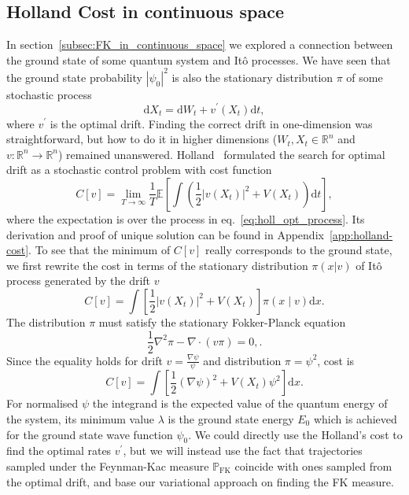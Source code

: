 \subsection{Holland Cost in continuous space}
In section~\ref{subsec:FK_in_continuous_space} we explored a connection between the ground state of some quantum system and It\^ o processes. We have seen that the ground state probability $|\psi_0|^2$ is also the stationary distribution $\pi$ of some stochastic process
\begin{equation}
	\label{eq:holl_opt_process}
	\mathrm{d} X_{t}=\mathrm{d} W_{t}+v^\prime\left(X_{t}\right) \mathrm{d} t,
\end{equation}
where $v^\prime$ is the optimal drift. Finding the correct drift in one-dimension was straightforward, but how to do it in higher dimensions ($W_{t}, X_{t} \in \mathbb{R}^n$ and $v: \mathbb{R}^n \rightarrow \mathbb{R}^n$) remained unanswered. Holland~\cite{holland1977cost} formulated the search for optimal drift as a stochastic control problem with cost function
\begin{equation}
	\label{eq:holland_cost}
	C[v]=\lim _{T \rightarrow \infty} \frac{1}{T} \mathbb{E}\left[\int \left(\frac{1}{2}\left|v\left(X_{t}\right)\right|^{2}+V\left(X_{t}\right)\right)\mathrm{d} t\right],
\end{equation}
where the expectation is over the process in eq.~\eqref{eq:holl_opt_process}. Its derivation and proof of unique solution can be found in Appendix~\ref{app:holland-cost}. To see that the minimum of $C[v]$ really corresponds to the ground state, we first rewrite the cost in terms of the stationary distribution $\pi(x | v)$ of It\^ o process generated by the drift $v$
\begin{equation}
C[v]=\int \left[\frac{1}{2}\left|v\left(X_{t}\right)\right|^{2}+V\left(X_{t}\right)\right] \pi(x \mid v)\mathrm{d}x.
\end{equation}
The distribution $\pi$ must satisfy the stationary Fokker-Planck equation
\begin{equation}
\frac{1}{2} \nabla^{2} \pi-\nabla \cdot(v \pi)=0,.
\end{equation}
Since the equality holds for drift $v = \frac{\nabla \psi}{\psi}$ and distribution $\pi = \psi^2$, cost is
\begin{equation}
C[v]=\int \left[\frac{1}{2}(\nabla \psi)^{2}+V\left(X_{t}\right) \psi^{2}\right]\mathrm{d}x.
\end{equation}
For normalised $\psi$ the integrand is the expected value of the quantum energy of the system, its minimum value $\lambda$ is the ground state energy $E_0$ which is achieved for the ground state wave function $\psi_{0}$. We could directly use the Holland's cost to find the optimal rates $v^\prime$, but we will instead use the fact that trajectories sampled under the Feynman-Kac measure $\mathbb{P}_{\mathrm{FK}}$ coincide with ones sampled from the optimal drift, and base our variational approach on finding the FK measure.

